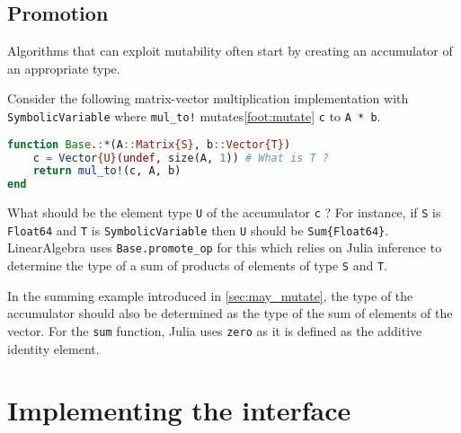 \documentclass{juliacon}
\begin{document}
\subsection{Promotion}
Algorithms that can exploit mutability often start by creating an accumulator of
an appropriate type.

Consider the following matrix-vector multiplication implementation with \lstinline|SymbolicVariable|
where \lstinline|mul_to!| mutates\cref{foot:mutate} \lstinline|c| to \lstinline|A * b|.
\begin{lstlisting}[language = Julia]
function Base.:*(A::Matrix{S}, b::Vector{T})
    c = Vector{U}(undef, size(A, 1)) # What is T ?
    return mul_to!(c, A, b)
end
\end{lstlisting}
What should be the element type \lstinline|U| of the accumulator \lstinline|c| ?
For instance, if \lstinline|S| is \lstinline|Float64|
and \lstinline|T| is \lstinline|SymbolicVariable|
then \lstinline|U| should be \lstinline|Sum{Float64}|.
LinearAlgebra uses \lstinline|Base.promote_op| for this which relies on Julia inference
to determine the type of a sum of products of elements of type \lstinline|S| and \lstinline|T|.

In the summing example introduced in \cref{sec:may_mutate},
the type of the accumulator should also be determined as the type of the sum of elements of the vector.
For the \lstinline|sum| function, Julia uses \lstinline|zero| as it is defined as
the additive identity element.

\section{Implementing the interface}
\label{sec:impl}
\end{document}
